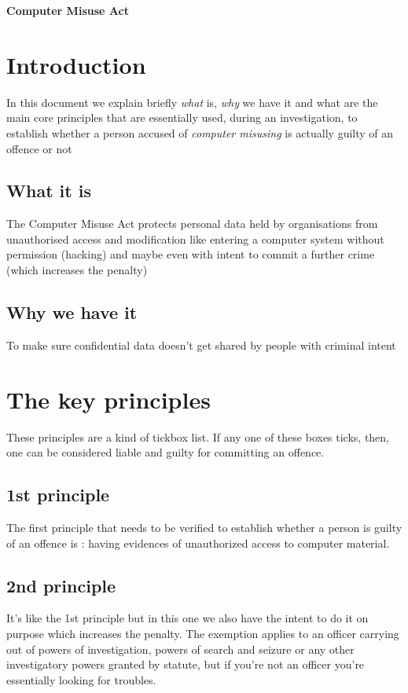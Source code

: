 \documentclass[a4paper,12pt]{article}
\begin{document}
\textbf{Computer Misuse Act}


\tableofcontents
\clearpage

 
\section{Introduction}

In this document we explain briefly \emph{what}  is, \emph{why} we have it and what are the main core principles that are essentially used, during an investigation, to establish whether a person accused of \emph{computer misusing} is actually guilty of an offence or not

 
\subsection{What it is}
The Computer Misuse Act protects personal data held by organisations from unauthorised access and modification like entering a computer system without permission (hacking) and maybe even with intent to commit a further crime (which increases the penalty)


 
\subsection{Why we have it}
To make sure confidential data doesn't get shared by people with criminal intent


 
\section{The key principles}

These principles are a kind of tickbox list. If any one of these boxes ticks, then, one can be considered liable and guilty for committing an offence.
 
\subsection{1st principle}
The first principle that needs to be verified to establish whether a person is guilty of an offence is : having evidences of unauthorized access to computer material.

 
\subsection{2nd principle}
It's like the 1st principle but in this one we also have the intent to do it on purpose which increases the penalty. The exemption applies to an officer carrying out of powers of investigation, powers of search and seizure or any other investigatory powers granted by statute, but if you're not an officer you're essentially looking for troubles.
\end{document}
